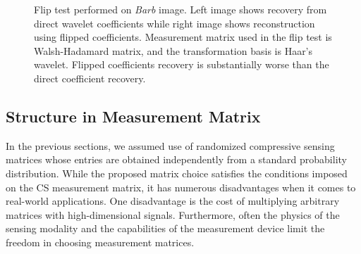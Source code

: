\documentclass[journal]{IEEEtran}
\begin{document}
%
\begin{figure}
	\centering
	
	
	\caption{Flip test performed on \textit{Barb} image. Left image shows recovery from direct wavelet coefficients while right image shows reconstruction using flipped coefficients. Measurement matrix used in the flip test is Walsh-Hadamard matrix, and the transformation basis is Haar's wavelet. Flipped coefficients recovery is substantially worse than the direct coefficient recovery.}
	
	\label{fig:flip_test_reconstruction}
\end{figure}

\subsection{Structure in Measurement Matrix}
In the previous sections, we assumed use of randomized compressive sensing matrices whose entries are obtained independently from a standard probability distribution. While the proposed matrix choice satisfies the conditions imposed on the CS measurement matrix, it has numerous disadvantages when it comes to real-world applications. One disadvantage is the cost of multiplying arbitrary matrices with high-dimensional signals. Furthermore, often the physics of the sensing modality and the capabilities of the measurement device limit the freedom in choosing measurement matrices. 
\end{document}
